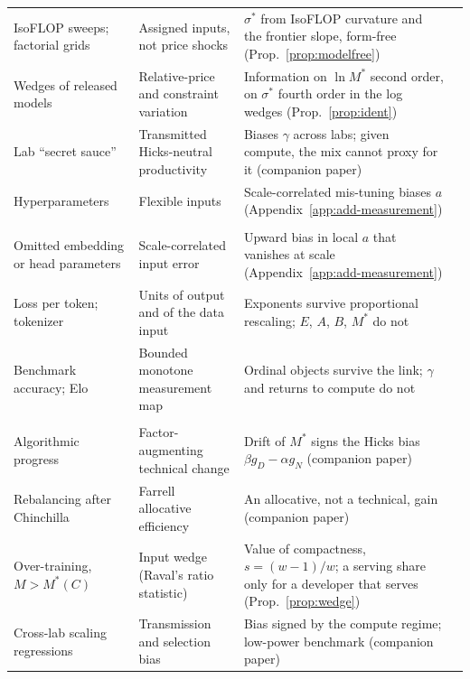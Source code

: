 \begin{table}[tp]
\begin{tabular}{@{}>{\raggedright\arraybackslash}p{24mm}>{\raggedright\arraybackslash}p{29mm}>{\raggedright\arraybackslash}p{50mm}>{\raggedright\arraybackslash}p{24mm}@{}}
IsoFLOP sweeps; factorial grids & Assigned inputs, not price shocks & $\sigma^*$ from IsoFLOP curvature and the frontier slope, form-free (Prop.~\ref{prop:modelfree}) & \citealt{box1959design} \\
Wedges of released models & Relative-price and constraint variation & Information on $\ln M^*$ second order, on $\sigma^*$ fourth order in the log wedges (Prop.~\ref{prop:ident}) & \citealt{kiefer1959optimum} \\
Lab ``secret sauce'' & Transmitted Hicks-neutral productivity & Biases $\gamma$ across labs; given compute, the mix cannot proxy for it (companion paper) & \citealt{ackerberg2015identification} \\
Hyper\-parameters & Flexible inputs & Scale-correlated mis-tuning biases $a$ (Appendix~\ref{app:add-measurement}) & \citealt{gandhi2020identification} \\
\multicolumn{4}{@{}l}{\textit{Panel C. Measurement}}\\
Omitted embedding or head parameters & Scale-correlated input error & Upward bias in local $a$ that vanishes at scale (Appendix~\ref{app:add-measurement}) & \citealt{collardwexler2016production} \\
Loss per token; tokenizer & Units of output and of the data input & Exponents survive proportional rescaling; $E$, $A$, $B$, $M^*$ do not & \citealt{tao2024scaling} \\
Benchmark accuracy; Elo & Bounded monotone measurement map & Ordinal objects survive the link; $\gamma$ and returns to compute do not & \citealt{gadre2024language} \\
\multicolumn{4}{@{}l}{\textit{Panel D. Productivity and wedges}}\\
Algorithmic progress & Factor-augmenting technical change & Drift of $M^*$ signs the Hicks bias $\beta g_D-\alpha g_N$ (companion paper) & \citealt{ho2024algorithmic} \\
Rebalancing after Chinchilla & Farrell allocative efficiency & An allocative, not a technical, gain (companion paper) & \citealt{gundlach2025origin} \\
Over-training, $M>M^*(C)$ & Input wedge (Raval's ratio statistic) & Value of compactness, $s=(w-1)/w$; a serving share only for a developer that serves (Prop.~\ref{prop:wedge}) & \citealt{raval2023testing} \\
Cross-lab scaling regressions & Transmission and selection bias & Bias signed by the compute regime; low-power benchmark (companion paper) & \citealt{whitfill2025note} \\

\end{tabular}
\end{table}
